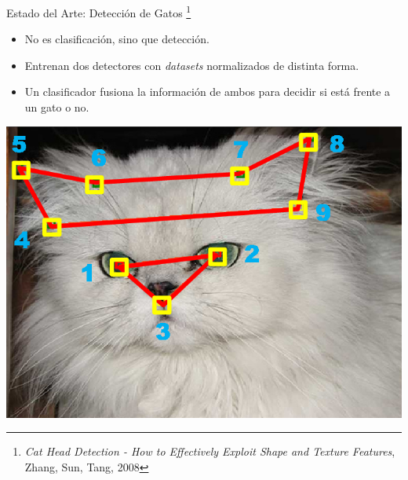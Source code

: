 \documentclass{beamer}
\begin{document}
\begin{frame}{Estado del Arte: Detección de Gatos \footnote{\emph{Cat Head
            Detection - How to Effectively Exploit Shape and Texture Features},
    Zhang, Sun, Tang, 2008}}
    \begin{itemize}
            \pause
        \item No es clasificación, sino que detección.
            \pause
        \item Entrenan dos detectores con \emph{datasets} normalizados de
            distinta forma.
            \pause
        \item Un clasificador fusiona la información de ambos para decidir
            si está frente a un gato o no.
            \pause
    \end{itemize}
    \begin{center}
        \includegraphics[scale=0.25]{imagen/annotation}
    \end{center}
\end{frame}
\end{document}
